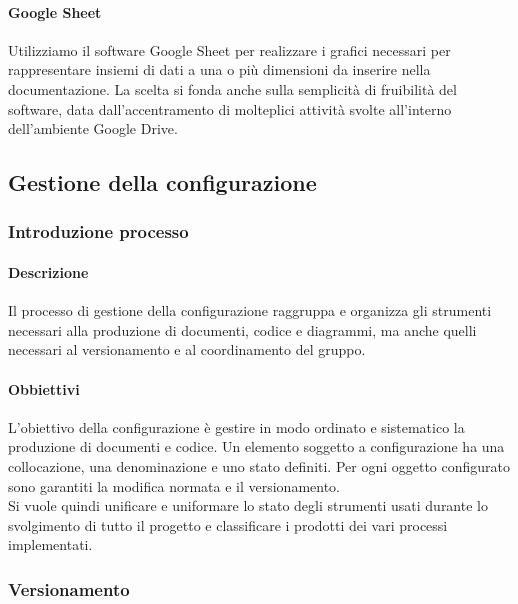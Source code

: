            \paragraph{Google Sheet}
                Utilizziamo il software Google Sheet per realizzare i grafici necessari per rappresentare insiemi di dati a una o più dimensioni da inserire nella documentazione. La scelta si fonda anche sulla semplicità di fruibilità del software, data dall’accentramento di molteplici attività svolte all’interno dell’ambiente Google Drive.

    \subsection{Gestione della configurazione}
        \subsubsection{Introduzione processo}
            \paragraph{Descrizione}
                Il processo di gestione della configurazione raggruppa e organizza gli strumenti necessari alla produzione di documenti, codice e diagrammi, ma anche quelli necessari al versionamento e al coordinamento del gruppo.
            \paragraph{Obbiettivi}
                L’obiettivo della configurazione è gestire in modo ordinato e sistematico la produzione di documenti e codice. Un elemento soggetto a configurazione ha una collocazione, una denominazione e uno stato definiti. Per ogni oggetto configurato sono garantiti la modifica normata e il versionamento. \\
                Si vuole quindi unificare e uniformare lo stato degli strumenti usati durante lo svolgimento di tutto il progetto e classificare i prodotti dei vari processi implementati.
        \subsubsection{Versionamento}

